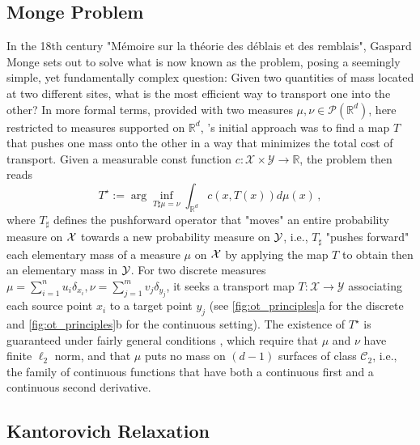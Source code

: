 \subsection{Monge Problem} \label{sec:background_monge}

In the 18th century "M{\'e}moire sur la th{\'e}orie des d{\'e}blais et des remblais", Gaspard Monge sets out to solve what is now known as the \citeauthor{monge1781histoire} problem, posing a seemingly simple, yet fundamentally complex question: Given two quantities of mass located at two different sites, what is the most efficient way to transport one into the other?
In more formal terms, provided with two measures $\mu, \nu\in \mathcal{P}(\mathbb{R}^d)$, here restricted to measures supported on $\mathbb{R}^d$, \citeauthor{monge1781histoire}'s initial approach was to find a map $T$ that pushes one mass onto the other in a way that minimizes the total cost of transport.
Given a measurable const function $c: \mathcal{X} \times \mathcal{Y} \rightarrow \mathbb{R}$, the \citeauthor{monge1781histoire} problem then reads
\begin{equation}\label{eq:monge}
T^\star := \arg\inf_{T\sharp\mu=\nu}\int_{\mathbb{R}^d} c(x, T(x)) d\mu(x)\,,
\end{equation}
where $T_\sharp$ defines the pushforward operator that "moves" an entire probability measure on ${\mathcal{X}}$ towards a new probability measure on ${\mathcal{Y}}$, i.e., $T_\sharp$ "pushes forward" each elementary mass of a measure $\mu$ on ${\mathcal{X}}$ by applying the map $T$ to obtain then an elementary mass in ${\mathcal{Y}}$.
For two discrete measures $\mu=\sum_{i=1}^n u_i \delta_{x_{i}}, \nu=\sum_{j=1}^m v_j \delta_{y_{j}}$, it seeks a transport map $T: \mathcal{X} \rightarrow \mathcal{Y}$ associating each source point $x_i$ to a target point $y_j$ (see \cref{fig:ot_principles}a for the discrete and \cref{fig:ot_principles}b for the continuous setting).
The existence of $T^\star$ is guaranteed under fairly general conditions \citep[Theorem 1.22]{santambrogio2015optimal}, which require that $\mu$ and $\nu$ have finite $\ell_2$ norm, and that $\mu$ puts no mass on $(d-1)$ surfaces of class $\mathcal{C}_2$, 
i.e., the family of continuous functions that have both a continuous first and a continuous second derivative.


\subsection{Kantorovich Relaxation} \label{sec:background_kantorovich}


